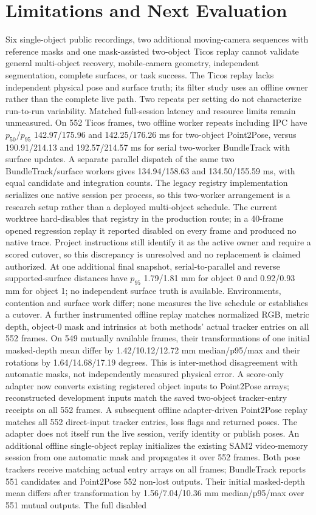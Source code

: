 \documentclass[10pt,journal]{IEEEtran}
\begin{document}
\section{Limitations and Next Evaluation}
Six single-object public recordings, two additional moving-camera sequences with reference masks and one mask-assisted two-object Ticos replay cannot validate general multi-object recovery, mobile-camera geometry, independent segmentation, complete surfaces, or task success. The Ticos replay lacks independent physical pose and surface truth; its filter study uses an offline owner rather than the complete live path. Two repeats per setting do not characterize run-to-run variability. Matched full-session latency and resource limits remain unmeasured. On 552 Ticos frames, two offline worker repeats including IPC have $p_{50}/p_{95}$ 142.97/175.96 and 142.25/176.26 ms for two-object Point2Pose, versus 190.91/214.13 and 192.57/214.57 ms for serial two-worker BundleTrack with surface updates. A separate parallel dispatch of the same two BundleTrack/surface workers gives 134.94/158.63 and 134.50/155.59 ms, with equal candidate and integration counts. The legacy registry implementation serializes one native session per process, so this two-worker arrangement is a research setup rather than a deployed multi-object schedule. The current worktree hard-disables that registry in the production route; in a 40-frame opened regression replay it reported disabled on every frame and produced no native trace. Project instructions still identify it as the active owner and require a scored cutover, so this discrepancy is unresolved and no replacement is claimed authorized. At one additional final snapshot, serial-to-parallel and reverse supported-surface distances have $p_{95}$ 1.79/1.81 mm for object 0 and 0.92/0.93 mm for object 1; no independent surface truth is available. Environments, contention and surface work differ; none measures the live schedule or establishes a cutover. A further instrumented offline replay matches normalized RGB, metric depth, object-0 mask and intrinsics at both methods' actual tracker entries on all 552 frames. On 549 mutually available frames, their transformations of one initial masked-depth mean differ by 1.42/10.12/12.72 mm median/p95/max and their rotations by 1.64/14.68/17.19 degrees. This is inter-method disagreement with automatic masks, not independently measured physical error. A score-only adapter now converts existing registered object inputs to Point2Pose arrays; reconstructed development inputs match the saved two-object tracker-entry receipts on all 552 frames. A subsequent offline adapter-driven Point2Pose replay matches all 552 direct-input tracker entries, loss flags and returned poses. The adapter does not itself run the live session, verify identity or publish poses. An additional offline single-object replay initializes the existing SAM2 video-memory session from one automatic mask and propagates it over 552 frames. Both pose trackers receive matching actual entry arrays on all frames; BundleTrack reports 551 candidates and Point2Pose 552 non-lost outputs. Their initial masked-depth mean differs after transformation by 1.56/7.04/10.36 mm median/p95/max over 551 mutual outputs. The full disabled 
\end{document}
